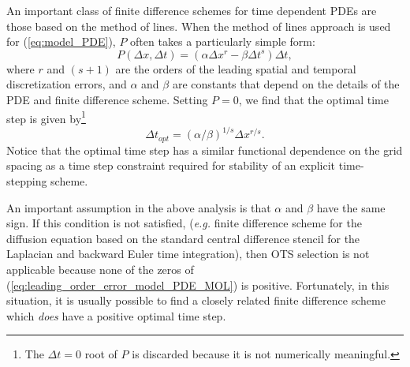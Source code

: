 \documentclass[fleqn,12pt,twoside]{article}
\newcommand{\beq}{\begin{equation}}
\newcommand{\eeq}{\end{equation}}
\def\dt{\Delta t}
\def\dx{\Delta x}
\def\dto{\dt_{opt}}
\def\eg{\emph{e.g. }}
\begin{document}
An important class of finite difference schemes for time dependent PDEs are 
those based on the method of lines.   When the method of lines approach is 
used for (\ref{eq:model_PDE}), $P$ often takes a particularly simple 
form:
\beq
  P(\dx, \dt) = (\alpha \dx^r - \beta \dt^s) \dt,
  \label{eq:leading_order_error_model_PDE_MOL}
\eeq
where $r$ and $(s+1)$ are the orders of the leading spatial and temporal 
discretization errors, and $\alpha$ and $\beta$ are constants that 
depend on the details of the PDE and finite difference scheme.  Setting 
$P = 0$, we find that the optimal time step is given by\footnote{The $\dt = 0$ 
root of $P$ is discarded because it is not numerically meaningful.}
\beq
  \dto = \left(\alpha/\beta \right)^{1/s} \dx^{r/s}.
  \label{eq:optimal_time_step}
\eeq
Notice that the optimal time step has a similar functional dependence on the 
grid spacing as a time step constraint required for stability of an explicit
time-stepping scheme.

An important assumption in the above analysis is that $\alpha$ and $\beta$ 
have the same sign.  If this condition is not satisfied, (\eg finite
difference scheme for the diffusion equation based on the standard central
difference stencil for the Laplacian and backward Euler time integration),
then OTS selection is not applicable because none of the zeros of 
(\ref{eq:leading_order_error_model_PDE_MOL}) is positive.  Fortunately, 
in this situation, it is usually possible to find a closely related finite 
difference scheme which \emph{does} have a positive optimal time step.
\end{document}
